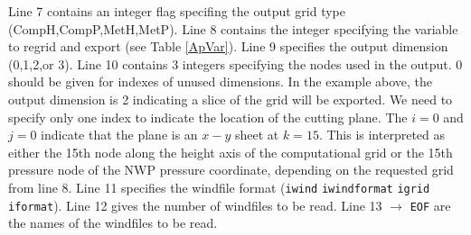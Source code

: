 \documentclass[11pt]{article}   %
\begin{document}
Line 7 contains an integer flag specifing the output grid type (CompH,CompP,MetH,MetP).
Line 8 contains the integer specifying the variable to regrid and export (see Table \ref{ApVar}).
Line 9 specifies the output dimension (0,1,2,or 3).
Line 10 contains 3 integers specifying the nodes used in the output. 0 should be given for indexes of unused
dimensions.  In the example above, the output dimension is 2 indicating a slice of the grid will be
exported.  We need to specify only one index to indicate the location of the cutting plane.  The $i=0$
and $j=0$ indicate that the plane is an $x-y$ sheet at $k=15$.  This is interpreted as either the 15th node
along the height axis of the computational grid or the 15th pressure node of the NWP pressure coordinate,
depending on the requested grid from line 8.
Line 11 specifies the windfile format (\texttt{iwind} \texttt{iwindformat} \texttt{igrid} \texttt{iformat}).
Line 12 gives the number of windfiles to be read.
Line 13 $\rightarrow$ \texttt{EOF} are the names of the windfiles to be read.
\end{document}
